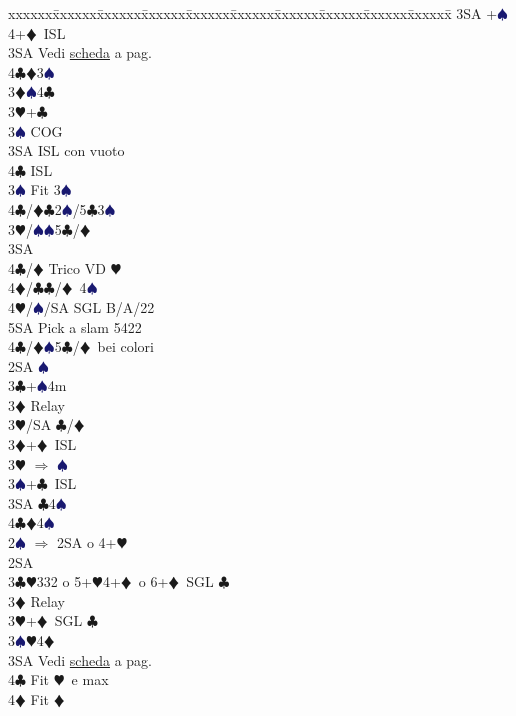 \documentclass[a4paper,italian]{article}
\newcommand{\BC}{\textcolor{OliveGreen}{$\clubsuit$}}
\newcommand{\BD}{\textcolor{RedOrange}{$\vardiamondsuit$}}
\newcommand{\BH}{\textcolor{Red2}{$\varheartsuit${}}}
\newcommand{\BS}{\textcolor{MidnightBlue}{$\spadesuit${}}}
\newenvironment{bidtable}
{\begin{tabbing}

    xxxxxx\=xxxxxx\=xxxxxx\=xxxxxx\=xxxxxx\=xxxxxx\=xxxxxx\=xxxxxx\=xxxxxx\=xxxxxx\=\kill}
{\end{tabbing} }%
\begin{document}
\begin{multicols}{2}
\begin{bidtable}
        3SA +\BS 4+\BD\ ISL\-\\
        3SA\> Vedi \hyperref[Riapertura3SA]{scheda} a pag. \pageref{Riapertura3SA}\\
        4\BC {}\BD 3\BS \-\\
        3\BD {}\BS 4\BC \+\\
        3\BH {}+\BC \+\\
        3\BS \> COG\\
        3SA \> ISL con vuoto\\
        4\BC \> ISL\-\\
        3\BS \> Fit 3\BS\\
        4\BC/\BD{}\BC2\BS/5\BC3\BS\-\\
        3\BH/\BS {}\BS 5\BC /\BD \+\\
        3SA\+\\
        4\BC/\BD \> Trico VD \BH \\
        4\BD/\BC {}\BC /\BD\ 4\BS \\
        4\BH/\BS/SA \>\> SGL B/A/22\\
        5SA \> Pick a slam 5422\-\-\\
        4\BC/\BD {}\BS 5\BC /\BD\ bei colori\-\\
        2SA \BS \+\\
        3\BC {}+\BS 4m\+\\
        3\BD \> Relay\+\\
        3\BH/SA \BC /\BD \-\-\\
        3\BD {}+\BD\ ISL\\
        3\BH \> $\Rightarrow$ \BS\\
        3\BS {}+\BC\ ISL\\
        3SA \BC 4\BS \\
        4\BC {}\BD 4\BS \-\-\\
        2\BS \> $\Rightarrow$ 2SA o 4+\BH \+\\
        2SA\+\\
        3\BC {}\BH 332 o 5+\BH 4+\BD\ o 6+\BD\ SGL \BC \+\\
        3\BD \> Relay\+\\
        3\BH {}+\BD\ SGL \BC \\
        3\BS {}\BH 4\BD \+\\
        3SA\> Vedi \hyperref[Riapertura3SA]{scheda} a pag. \pageref{Riapertura3SA}\\
        4\BC\> Fit \BH\ e max\\
        4\BD\> Fit \BD\\

\end{bidtable}
\end{multicols}
\end{document}
